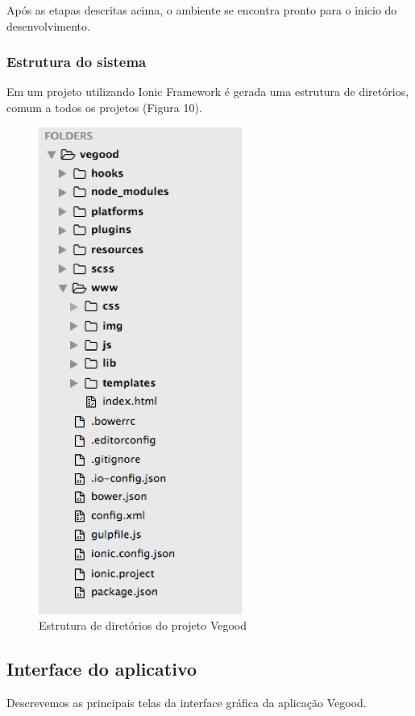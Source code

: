 Após as etapas descritas acima, o ambiente se encontra pronto para o inicio do desenvolvimento.

\subsubsection{Estrutura do sistema}
Em um projeto utilizando Ionic Framework é gerada uma estrutura de diretórios, comum a todos os projetos (Figura 10).

\begin{figure}[H]
	\caption{\label{fig:estrutura-de-diretorios-do-projeto}Estrutura de diretórios do projeto Vegood}
	\centering
	\includegraphics[scale=1]{imagens/figura10.png}
\end{figure}


\subsection{Interface do aplicativo}
Descrevemos as principais telas da interface gráfica da aplicação Vegood.

